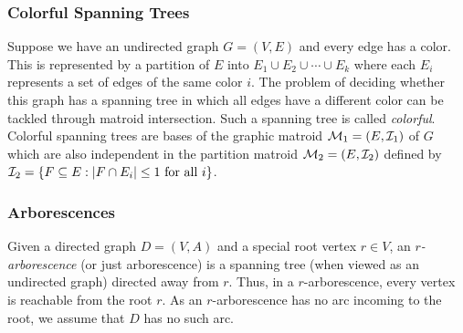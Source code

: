 \subsubsection{Colorful Spanning Trees}

Suppose we have an undirected graph $G=(V,E)$ and every edge has a color. This is represented by a
partition of $E$ into $E_1\cup E_2\cup\cdots\cup E_k$ where each $E_i$ represents a set of edges
of the same color $i$. The problem of deciding whether this graph has a spanning tree in which all
edges have a different color can be tackled through matroid intersection. Such a spanning tree is
called \emph{colorful}. Colorful spanning trees are bases of the graphic matroid
$\mathcal{M}_1=(E,\mathcal{I}_1)$ of $G$ which are also independent in the partition matroid $\mathcal{M}_2=(E,\mathcal{I}_2)$
defined by $\mathcal{I}_2=\{F\subseteq E: |F\cap E_i|\le 1 \text{ for all } i\}$.

\subsubsection{Arborescences}

Given a directed graph $D=(V,A)$ and a special root vertex $r\in V$, an \emph{$r$-arborescence}
(or just arborescence) is a spanning tree (when viewed as an undirected graph) directed away from
$r$. Thus, in a $r$-arborescence, every vertex is reachable from the root $r$. As an
$r$-arborescence has no arc incoming to the root, we assume that $D$ has no such arc.


